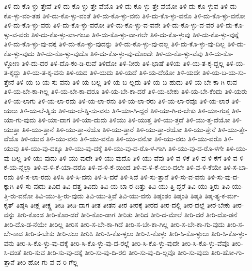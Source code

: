 {ತಿಳಿ-ದು-ಕೊ-ಳ್ಳು-ತ್ತೇವೆ
ತಿಳಿ-ದು-ಕೊ-ಳ್ಳು-ತ್ತೇ-ವೆಯೊ
ತಿಳಿ-ದು-ಕೊ-ಳ್ಳು-ತ್ತೇ-ವೆಯೋ
ತಿಳಿ-ದು-ಕೊ-ಳ್ಳುವ
ತಿಳಿ-ದು-ಕೊ-ಳ್ಳು-ವಂ-ತಹ
ತಿಳಿ-ದು-ಕೊ-ಳ್ಳು-ವಂತೆ
ತಿಳಿ-ದು-ಕೊ-ಳ್ಳು-ವನು
ತಿಳಿ-ದು-ಕೊ-ಳ್ಳು-ವನೊ
ತಿಳಿ-ದು-ಕೊ-ಳ್ಳು-ವನೋ
ತಿಳಿ-ದು-ಕೊ-ಳ್ಳು-ವರು
ತಿಳಿ-ದು-ಕೊ-ಳ್ಳು-ವರೋ
ತಿಳಿ-ದು-ಕೊ-ಳ್ಳು-ವ-ವನೇ
ತಿಳಿ-ದು-ಕೊ-ಳ್ಳು-ವ-ವರ
ತಿಳಿ-ದು-ಕೊ-ಳ್ಳು-ವ-ವರು
ತಿಳಿ-ದು-ಕೊ-ಳ್ಳು-ವಾ-ಗಲೂ
ತಿಳಿ-ದು-ಕೊ-ಳ್ಳು-ವಾ-ಗಲೇ
ತಿಳಿ-ದು-ಕೊ-ಳ್ಳುವು
ತಿಳಿ-ದು-ಕೊ-ಳ್ಳು-ವುಕ್ಕೆ
ತಿಳಿ-ದು-ಕೊ-ಳ್ಳು-ವು-ದಕ್ಕೆ
ತಿಳಿ-ದು-ಕೊ-ಳ್ಳು-ವುದನ್ನು
ತಿಳಿ-ದು-ಕೊ-ಳ್ಳು-ವು-ದಲ್ಲ
ತಿಳಿ-ದು-ಕೊ-ಳ್ಳು-ವು-ದಿಲ್ಲ
ತಿಳಿ-ದು-ಕೊ-ಳ್ಳು-ವುದು
ತಿಳಿ-ದು-ಕೊ-ಳ್ಳು-ವುದೊ
ತಿಳಿ-ದು-ಕೊ-ಳ್ಳು-ವು-ದೊಂದೇ
ತಿಳಿ-ದು-ಕೊ-ಳ್ಳು-ವೆವು
ತಿಳಿ-ದು-ಕೊ-ಳ್ಳೋಣ
ತಿಳಿ-ದು-ದರ
ತಿಳಿ-ದೊ-ಕಂ-ಡಿ-ರುವೆ
ತಿಳಿದೋ
ತಿಳಿ-ನೀರು
ತಿಳಿ-ಭಾಷೆ
ತಿಳಿಯ
ತಿಳಿ-ಯ-ತ-ಕ್ಕ-ದ್ದಲ್ಲ
ತಿಳಿ-ಯ-ತ-ಕ್ಕದ್ದು
ತಿಳಿ-ಯ-ತ-ಕ್ಕ-ವನು
ತಿಳಿ-ಯದ
ತಿಳಿ-ಯದು
ತಿಳಿ-ಯದೆ
ತಿಳಿ-ಯ-ದೆಯೋ
ತಿಳಿ-ಯದೇ
ತಿಳಿ-ಯ-ಬ-ಯ-ಸು-ತ್ತೇನೆ
ತಿಳಿ-ಯ-ಬ-ಯ-ಸು-ವನು
ತಿಳಿ-ಯ-ಬಲ್ಲ
ತಿಳಿ-ಯ-ಬ-ಲ್ಲದು
ತಿಳಿ-ಯ-ಬ-ಹುದು
ತಿಳಿ-ಯ-ಬೇ-ಕಾ-ಗಿ-ರುವ
ತಿಳಿ-ಯ-ಬೇ-ಕಾ-ಗಿಲ್ಲ
ತಿಳಿ-ಯ-ಬೇ-ಕಾ-ದರೂ
ತಿಳಿ-ಯ-ಬೇ-ಕಾ-ದರೆ
ತಿಳಿ-ಯ-ಬೇಕು
ತಿಳಿ-ಯ-ಬೇ-ಕೆಂದು
ತಿಳಿ-ಯರು
ತಿಳಿ-ಯ-ಲಾಗು
ತಿಳಿ-ಯ-ಲಾ-ರದು
ತಿಳಿ-ಯ-ಲಾ-ರನು
ತಿಳಿ-ಯ-ಲಾ-ರರು
ತಿಳಿ-ಯ-ಲಾ-ರವೊ
ತಿಳಿ-ಯ-ಲಾರೆ
ತಿಳಿ-ಯಲು
ತಿಳಿ-ಯ-ಲೆ-ತ್ನಿಸು
ತಿಳಿ-ಯ-ಲೆ-ತ್ನಿ-ಸು-ವನು
ತಿಳಿ-ಯಾ-ಗಿ-ದ್ದರೆ
ತಿಳಿ-ಯಾ-ಗಿ-ರ-ಬೇಕು
ತಿಳಿ-ಯಾ-ಗುತ್ತ
ತಿಳಿ-ಯಾ-ಗು-ವುದು
ತಿಳಿ-ಯಾ-ದಾಗ
ತಿಳಿ-ಯಾ-ದುದು
ತಿಳಿಯು
ತಿಳಿ-ಯುತ್ತ
ತಿಳಿ-ಯು-ತ್ತದೆ
ತಿಳಿ-ಯು-ತ್ತ-ದೆಯೋ
ತಿಳಿ-ಯುತ್ತಾ
ತಿಳಿ-ಯು-ತ್ತಾನೆ
ತಿಳಿ-ಯು-ತ್ತಾ-ನೆಯೊ
ತಿಳಿ-ಯು-ತ್ತಾರೆ
ತಿಳಿ-ಯು-ತ್ತಾ-ರೆಯೋ
ತಿಳಿ-ಯು-ತ್ತೇನೆ
ತಿಳಿ-ಯು-ತ್ತೇ-ವೆಯೊ
ತಿಳಿ-ಯುವ
ತಿಳಿ-ಯು-ವನು
ತಿಳಿ-ಯು-ವನೊ
ತಿಳಿ-ಯು-ವನೋ
ತಿಳಿ-ಯು-ವರು
ತಿಳಿ-ಯು-ವರೊ
ತಿಳಿ-ಯುವು
ತಿಳಿ-ಯು-ವು-ದಕ್ಕೂ
ತಿಳಿ-ಯು-ವು-ದಕ್ಕೆ
ತಿಳಿ-ಯು-ವು-ದ-ರೊ-ಳ-ಗಾಗಿ
ತಿಳಿ-ಯು-ವು-ದ-ರೊ-ಳಗೇ
ತಿಳಿ-ಯು-ವು-ದಿಲ್ಲ
ತಿಳಿ-ಯು-ವುದು
ತಿಳಿ-ಯು-ವುದೇ
ತಿಳಿ-ಯು-ವುದೊ
ತಿಳಿ-ಯು-ವೆವು
ತಿಳಿ-ವ-ಳಿಕೆ
ತಿಳಿ-ವ-ಳಿ-ಕೆಗೆ
ತಿಳಿ-ವ-ಳಿ-ಕೆ-ಯ-ನ್ನೆಲ್ಲಾ
ತಿಳಿ-ವ-ಳಿ-ಕೆ-ಯಾ-ದರೊ
ತಿಳಿ-ವ-ಳಿ-ಕೆ-ಯಿಂದ
ತಿಳಿ-ವ-ಳಿ-ಕೆ-ಯಿಂ-ದಲೇ
ತಿಳಿ-ವ-ಳಿ-ಕೆಯೇ
ತಿಳಿ-ಸ-ಬಾ-ರದು
ತಿಳಿ-ಸ-ಲಾ-ರದು
ತಿಳಿಸಿ
ತಿಳಿ-ಸಿ-ದನು
ತಿಳಿ-ಸಿ-ದರೆ
ತಿಳಿ-ಸಿದೆ
ತಿಳಿ-ಸು-ತ್ತಾನೆ
ತಿಳಿ-ಸು-ವ-ವನು
ತಿಳಿ-ಸು-ವು-ದ-ಕ್ಕಾಗಿ
ತಿಳಿ-ಸು-ವುದು
ತಿವಿದ
ತಿವಿ-ದತ್ತ
ತಿವಿದು
ತಿವಿ-ಯ-ಬಾ-ರ-ದಿತ್ತು
ತಿವಿ-ಯು-ತ್ತಿ-ದ್ದರೆ
ತಿವಿ-ಯು-ತ್ತಿರು
ತಿವಿ-ಯು-ತ್ತಿ-ರು-ವನೋ
ತಿವಿ-ಯು-ತ್ತಿ-ರು-ವುದು
ತಿವಿ-ಯು-ತ್ತಿವೆ
ತಿವಿ-ಯು-ವನು
ತಿಷ್ಠಂತಂ
ತಿಷ್ಠಂತಿ
ತಿಷ್ಠತಿ
ತಿಷ್ಠ-ತ್ಯ-ಕ-ರ್ಮ-ಕೃತ್
ತಿಷ್ಠಸಿ
ತೀಕ್ಷ
ತೀಕ್ಷ್ಣ
ತೀಡಿ
ತೀಡಿ-ದಾಗ
ತೀತ
ತೀತನ
ತೀರ
ತೀರಕ್ಕೆ
ತೀರದ
ತೀರ-ದಲ್ಲಿ
ತೀರ-ದಲ್ಲೆ
ತೀರ-ಬೇಕು
ತೀರ-ವನ್ನು
ತೀರಿ-ಕೊಂಡ
ತೀರಿ-ಕೊಂ-ಡರೆ
ತೀರಿ-ಕೊಂ-ಡಾಗ
ತೀರಿತು
ತೀರಿದ
ತೀರಿ-ದ-ಮೇಲೆ
ತೀರಿ-ದರೆ
ತೀರಿ-ದೊ-ಡನೆ
ತೀರಿ-ದೊ-ಡ-ನೆಯೇ
ತೀರಿಲ್ಲ
ತೀರಿಸ
ತೀರಿ-ಸ-ಬೇ-ಕಾ-ಗಿದೆ
ತೀರಿ-ಸ-ಬೇ-ಕಾ-ಗಿಲ್ಲ
ತೀರಿ-ಸ-ಬೇ-ಕಾ-ಗು-ವುದು
ತೀರಿ-ಸ-ಬೇ-ಕಾದ
ತೀರಿ-ಸ-ಬೇಕು
ತೀರಿ-ಸಲು
ತೀರಿಸಿ
ತೀರಿ-ಸಿ-ಕೊ-ಳ್ಳಲು
ತೀರಿ-ಸಿ-ಕೊಳ್ಳು
ತೀರಿ-ಸಿ-ಕೊ-ಳ್ಳುಲು
ತೀರಿ-ಸಿ-ಕೊ-ಳ್ಳು-ವನು
ತೀರಿ-ಸಿ-ಕೊ-ಳ್ಳು-ವು-ದಕ್ಕೆ
ತೀರಿ-ಸಿ-ಕೊ-ಳ್ಳು-ವು-ದ-ರಲ್ಲೆ
ತೀರಿ-ಸಿ-ಕೊ-ಳ್ಳು-ವುದೇ
ತೀರಿ-ಸಿ-ಕೊ-ಳ್ಳು-ವೆವೊ
ತೀರಿ-ಸಿ-ದಂತೆ
ತೀರಿ-ಸುವ
ತೀರಿ-ಸು-ವು-ದಕ್ಕೆ
ತೀರಿ-ಸು-ವು-ದಿ-ರಲಿ
ತೀರಿ-ಸು-ವು-ದಿ-ಲ್ಲವೊ
ತೀರಿ-ಸು-ವುದು
ತೀರಿ-ಹೋ-ಗು-ತ್ತಾನೆ
ತೀರಿ-ಹೋ-ಗು-ವ-ವ-ರಿ-ಗೆಲ್ಲ
}
